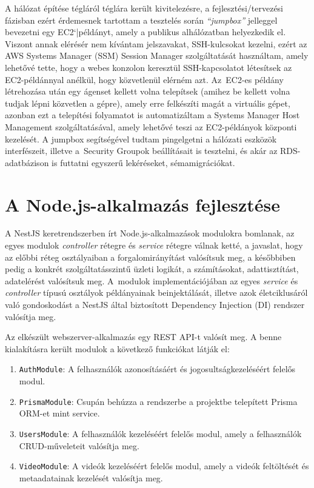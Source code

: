 A hálózat építése tégláról téglára került kivitelezésre, a fejlesztési/tervezési fázisban ezért érdemesnek tartottam a tesztelés során \emph{``jumpbox''} jelleggel bevezetni egy EC2`|példányt, amely a publikus alhálózatban helyezkedik el. Viszont annak elérésér nem kívántam jelszavakat, SSH-kulcsokat kezelni, ezért az AWS Systems Manager (SSM) Session Manager szolgáltatását használtam, amely lehetővé tette, hogy a webes konzolon keresztül SSH-kapcsolatot létesítsek az EC2-példánnyal anélkül, hogy közvetlenül elérném azt. Az~EC2-es példány létrehozása után egy ágenset kellett volna telepítsek (amihez be kellett volna tudjak lépni közvetlen a gépre), amely erre felkészíti magát a virtuális gépet, azonban ezt a telepítési folyamatot is automatizáltam a Systems Manager Host Management szolgáltatásával, amely lehetővé teszi az EC2-példányok központi kezelését. A jumpbox segítségével tudtam pingelgetni a hálózati eszközök interfészeit, illetve a~Security Groupok beállításait is tesztelni, és akár az RDS-adatbázison is futtatni egyszerű lekéréseket, sémamigrációkat.

\section{A Node.js-alkalmazás fejlesztése}\label{sec:nodejs}

A NestJS keretrendszerben írt Node.js-alkalmazások modulokra bomlanak, az egyes modulok \emph{controller} rétegre és \emph{service} rétegre válnak ketté, a javaslat, hogy az előbbi réteg osztályaiban a forgalomirányítást valósítsuk meg, a későbbiben pedig a konkrét szolgáltatásszintű üzleti logikát, a számításokat, adattisztítást, adatelérést valósítsuk meg. A~modulok implementációjában az egyes \emph{service} és \emph{controller} típusú osztályok példányainak beinjektálását, illetve azok életciklusáról való gondoskodást a NestJS által biztosított Dependency Injection (DI) rendszer valósítja meg.

Az elkészült webszerver-alkalmazás egy REST API-t valósít meg. A benne kialakításra került modulok a következő funkciókat látják el:

\begin{enumerate}
  \item \verb|AuthModule|: A felhasználók azonosításáért és jogosultságkezeléséért felelős modul.
  \item \verb|PrismaModule|: Csupán behúzza a rendszerbe a projektbe telepített Prisma ORM-et mint service.
  \item \verb|UsersModule|: A felhasználók kezeléséért felelős modul, amely a felhasználók CRUD-műveleteit valósítja meg.
  \item \verb|VideoModule|: A videók kezeléséért felelős modul, amely a videók feltöltését és metaadatainak kezelését valósítja meg.
\end{enumerate}

